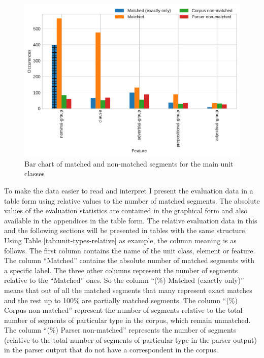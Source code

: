     
    \begin{figure}[!ht]
    \centering
    \includegraphics[width=.85\textwidth]{evaluation-results/figures/unit-types-data.pdf}
    \caption{Bar chart of matched and non-matched segments for the main unit classes}
    \label{fig:unit-types-data}
    \end{figure}
    
    To make the data easier to read and interpret I present the evaluation data in a table form using relative values to the number of matched segments. The absolute values of the evaluation statistics are contained in the graphical form and also available in the appendices in the table form. The relative evaluation data in this and the following sections will be presented in tables with the same structure. Using Table \ref{tab:unit-types-relative} as example, the column meaning is as follows. The first column contains the name of the unit class, element or feature. The column ``Matched'' contains the absolute number of matched segments with a specific label. The three other columns represent the number of segments relative to the ``Matched'' ones. So the column ``(\%) Matched (exactly only)'' means that out of all the matched segments that many represent exact matches and the rest up to 100\% are partially matched segments. The column ``(\%) Corpus non-matched'' represent the number of segments relative to the total number of segments of particular type in the corpus, which remain unmatched. %
    The column ``(\%) Parser non-matched'' represents the number of segments (relative to the total number of segments of particular type in the parser output) in the parser output that do not have a correspondent in the corpus.
    
